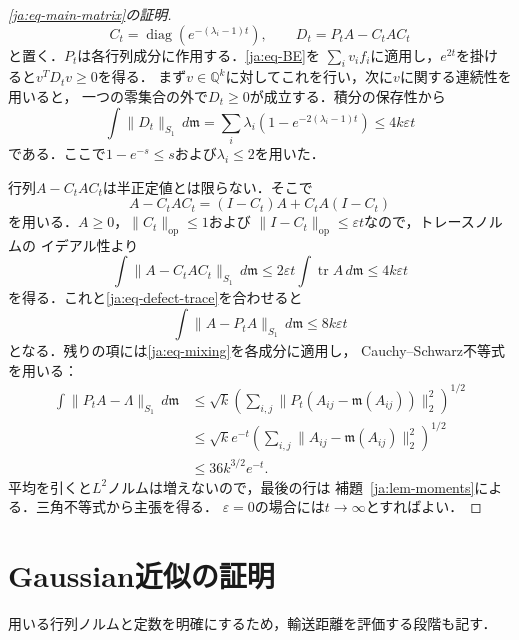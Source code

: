 \documentclass[12pt]{amsart}
\theoremstyle{definition}
\theoremstyle{remark}
\numberwithin{equation}{section}
\DeclareMathOperator{\tr}{tr}
\newcommand{\Q}{\mathbb{Q}}
\newcommand{\m}{\mathfrak m}
\theoremstyle{jpplain}
\begin{document}
\begin{proof}[\eqref{ja:eq-main-matrix}の証明]
\[
 C_t=\operatorname{diag}(e^{-(\lambda_i-1)t}),\qquad
 D_t=P_tA-C_tAC_t
\]
と置く．$P_t$は各行列成分に作用する．\eqref{ja:eq-BE}を
$\sum_i v_i f_i$に適用し，$e^{2t}$を掛けると$v^TD_tv\geq0$を得る．
まず$v\in\Q^k$に対してこれを行い，次に$v$に関する連続性を用いると，
一つの零集合の外で$D_t\geq0$が成立する．積分の保存性から
\begin{equation}\label{ja:eq-defect-trace}
 \int\|D_t\|_{S_1}\,d\m
 =\sum_i\lambda_i(1-e^{-2(\lambda_i-1)t})
 \leq4k\varepsilon t
\end{equation}
である．ここで$1-e^{-s}\leq s$および$\lambda_i\leq2$を用いた．

行列$A-C_tAC_t$は半正定値とは限らない．そこで
\[
 A-C_tAC_t=(I-C_t)A+C_tA(I-C_t)
\]
を用いる．$A\geq0$，$\|C_t\|_{\mathrm{op}}\leq1$および
$\|I-C_t\|_{\mathrm{op}}\leq\varepsilon t$なので，トレースノルムの
イデアル性より
\[
 \int\|A-C_tAC_t\|_{S_1}\,d\m
 \leq2\varepsilon t\int\tr A\,d\m
 \leq4k\varepsilon t
\]
を得る．これと\eqref{ja:eq-defect-trace}を合わせると
\begin{equation}\label{ja:eq-time-defect}
 \int\|A-P_tA\|_{S_1}\,d\m\leq8k\varepsilon t
\end{equation}
となる．残りの項には\eqref{ja:eq-mixing}を各成分に適用し，
Cauchy--Schwarz不等式を用いる：
\begin{align*}
 \int\|P_tA-\Lambda\|_{S_1}\,d\m
 &\leq\sqrt{k}\left(\sum_{i,j}
       \|P_t(A_{ij}-\m(A_{ij}))\|_2^2\right)^{1/2}\\
 &\leq\sqrt{k}e^{-t}
       \left(\sum_{i,j}\|A_{ij}-\m(A_{ij})\|_2^2\right)^{1/2}\\
 &\leq36k^{3/2}e^{-t}.
\end{align*}
平均を引くと$L^2$ノルムは増えないので，最後の行は
補題~\ref{ja:lem-moments}による．三角不等式から主張を得る．
$\varepsilon=0$の場合には$t\to\infty$とすればよい．
\end{proof}

\section{Gaussian近似の証明}

用いる行列ノルムと定数を明確にするため，輸送距離を評価する段階も記す．
\end{document}
